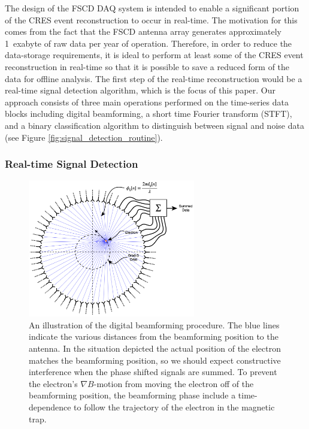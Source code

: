 The design of the FSCD DAQ system is intended to enable a significant portion of the CRES event reconstruction to occur in real-time. The motivation for this comes from the fact that the FSCD antenna array generates approximately 1~exabyte of raw data per year of operation. Therefore, in order to reduce the data-storage requirements, it is ideal to perform at least some of the CRES event reconstruction in real-time so that it is possible to save a reduced form of the data for offline analysis. The first step of the real-time reconstruction would be a real-time signal detection algorithm, which is the focus of this paper. Our approach consists of three main operations performed on the time-series data blocks including digital beamforming, a short time Fourier transform (STFT), and a binary classification algorithm to distinguish between signal and noise data (see Figure \ref{fig:signal_detection_routine}). 

\subsubsection{Real-time Signal Detection}
\label{sec:bf-and-stft}

\begin{figure}[htbp]
    \centering
    \includegraphics[width=0.65\textwidth]{figs/Chapter-4/230216_beamforming_diagram_annotated.001.png}
    \caption{An illustration of the digital beamforming procedure. The blue lines indicate the various distances from the beamforming position to the antenna. In the situation depicted the actual position of the electron matches the beamforming position, so we should expect constructive interference when the phase shifted signals are summed. To prevent the electron's $\nabla B$-motion from moving the electron off of the beamforming position, the beamforming phase include a time-dependence to follow the trajectory of the electron in the magnetic trap.}
    \label{fig:beamforming}
\end{figure}

